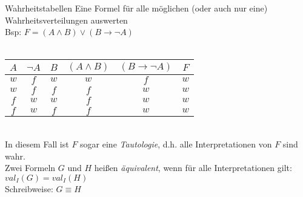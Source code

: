 \begin{frame}{Wahrheitstabellen}
	Eine Formel für alle möglichen (oder auch nur eine) Wahrheitsverteilungen auswerten\\
	Bsp: $F = (A\wedge B)\vee(B\rightarrow\neg A)$\\
	\textcolor{white}{.}\\ %
	\begin{tabular}{ccc|cc|c}
		$A$ & $\neg A$ & $B$ & $(A\wedge B)$ & $(B\rightarrow\neg A)$ & $F$ \\
		\hline
		$w$ & $f$      & $w$ & $w$           & $f$                    & $w$ \\
		$w$ & $f$      & $f$ & $f$           & $w$                    & $w$ \\
		$f$ & $w$      & $w$ & $f$           & $w$                    & $w$ \\
		$f$ & $w$      & $f$ & $f$           & $w$                    & $w$ \\
	\end{tabular}\\
	In diesem Fall ist $F$ sogar eine \emph{Tautologie}, d.h. alle Interpretationen von $F$ sind wahr.\\
	Zwei Formeln $G$ und $H$ heißen \emph{äquivalent}, wenn für alle Interpretationen gilt: $val_{I}(G) = val_{I}(H)$\\
	Schreibweise: $G\equiv H$\\
\end{frame}

